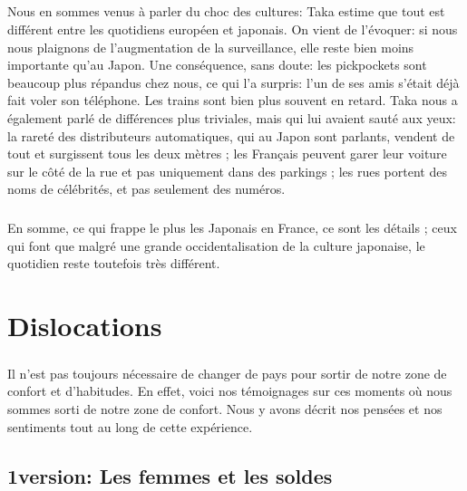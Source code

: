 \paragraph{} Nous en sommes venus à parler du choc des cultures: Taka estime
que tout est différent entre les quotidiens européen et japonais. On vient de
l'évoquer: si nous nous plaignons de l'augmentation de la surveillance, elle
reste bien moins importante qu'au Japon. Une conséquence, sans doute: les
pickpockets sont beaucoup plus répandus chez nous, ce qui l'a surpris: l'un de
ses amis s'était déjà fait voler son téléphone. Les trains sont bien plus
souvent en retard. Taka nous a également parlé de différences plus triviales,
mais qui lui avaient sauté aux yeux: la rareté des distributeurs automatiques,
qui au Japon sont parlants, vendent de tout et surgissent tous les deux mètres
; les Français peuvent garer leur voiture sur le côté de la rue et pas
uniquement dans des parkings ; les rues portent des noms de célébrités, et pas
seulement des numéros.

\paragraph{} En somme, ce qui frappe le plus les Japonais en France, ce sont
les détails ; ceux qui font que malgré une grande occidentalisation de la
culture japonaise, le quotidien reste toutefois très différent.


\chapter{Dislocations}

\paragraph{} Il n'est pas toujours nécessaire de changer de pays pour sortir de
notre zone de confort et d'habitudes. En effet, voici nos témoignages sur ces
moments où nous sommes sorti de notre zone de confort. Nous y avons décrit nos
pensées et nos sentiments tout au long de cette expérience.

\section{1\iere version: Les femmes et les soldes}

